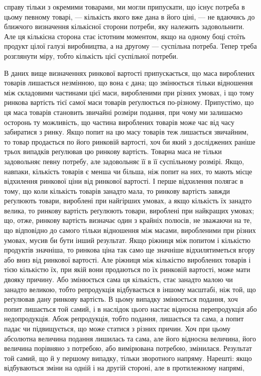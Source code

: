 \enlargethispage{\baselineskip}
\parcont{}  %
справу тільки з окремими товарами, ми могли припускати, що
існує потреба в цьому певному товарі, — кількість якого вже
дана в його ціні, — не вдаючись до ближчого визначення кількісної сторони потреби, яку належить
задовольнити. Але ця
кількісна сторона стає істотним моментом, якщо на одному боці
стоїть продукт цілої галузі виробництва, а на другому — суспільна потреба. Тепер треба розглянути
міру, тобто кількість цієї суспільної потреби.

В даних вище визначеннях ринкової вартості припускається,
що маса вироблених товарів лишається незмінною, що вона
є дана; що змінюється тільки відношення між складовими частинами цієї маси, виробленими при різних
умовах, і що тому
ринкова вартість тієї самої маси товарів реґулюється по-різному.
Припустімо, що ця маса товарів становить звичайні розміри
подання, при чому ми залишаємо осторонь ту можливість, що
частина вироблених товарів може час від часу забиратися
з ринку. Якщо попит на цю масу товарів теж лишається звичайним, то товар продається по його ринковій
вартості, хоч би
який з досліджених раніше трьох випадків реґулював цю ринкову вартість. Товарна маса не тільки
задовольняє певну потребу, але задовольняє її в її суспільному розмірі. Якщо, навпаки, кількість
товарів є менша чи більша, ніж попит на них,
то мають місце відхилення ринкової ціни від ринкової вартості.
І перше відхилення полягає в тому, що коли кількість товарів
занадто мала, то ринкову вартість завжди реґулюють товари,
вироблені при найгірших умовах, а якщо кількість їх занадто
велика, то ринкову вартість реґулюють товари, вироблені при
найкращих умовах; що, отже, ринкову вартість визначає один
з крайніх полюсів, не зважаючи на те, що відповідно до самого
тільки відношення між масами, виробленими при різних умовах,
мусив би бути інший результат. Якщо ріжниця між попитом
і кількістю продуктів значніша, то ринкова ціна так само ще
значніше відхилятиметься вгору або вниз від ринкової вартості.
Але ріжниця між кількістю вироблених товарів і тією кількістю
їх, при якій вони продаються по їх ринковій вартості, може
мати двояку причину. Або змінюється сама ця кількість, стає
занадто малою чи занадто великою, тобто репродукція відбувається в іншому масштабі, ніж той, що
реґулював дану
ринкову вартість. В цьому випадку змінюється подання, хоч
попит лишається той самий, і в наслідок цього настає відносна
перепродукція або недопродукція. Абож репродукція, тобто
подання, лишається та сама, а попит падає чи підвищується,
що може статися з різних причин. Хоч при цьому абсолютна
величина подання лишилась та сама, але його відносна величина,
його величина порівняно з потребою, або вимірювана потребою,
змінилася. Результат той самий, що й у першому випадку,
тільки зворотного напряму. Нарешті: якщо відбуваються зміни
на одній і на другій стороні, але в протилежному напрямі,
\parbreak{}  %
